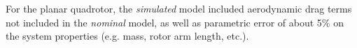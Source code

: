 \documentclass{article}
\begin{document}

For the planar quadrotor, the \textit{simulated} model included aerodynamic drag terms not
included in the \textit{nominal} model, as well as parametric error of about 5\% on the
system properties (e.g. mass, rotor arm length, etc.).

  

\end{document}

